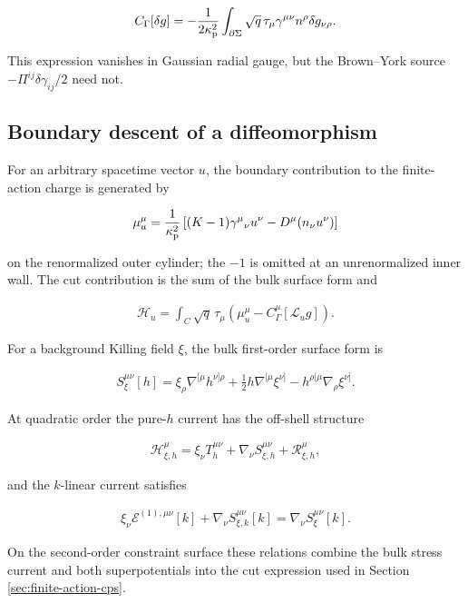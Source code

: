 \begin{align}
C_\Gamma[\delta g]
=-\frac1{2\kappa_{\rm p}^{2}}
\int_{\partial\Sigma}\sqrt q\,
\tau_\mu\gamma^{\mu\nu}n^\rho\delta g_{\nu\rho}.
\end{align}

This expression vanishes in Gaussian radial gauge, but the Brown--York source $-\Pi^{ij}\delta\gamma_{ij}/2$ need not.

\subsection{Boundary descent of a diffeomorphism}

For an arbitrary spacetime vector $u$, the boundary contribution to the finite-action charge is generated by

\begin{align}
\mu_u^\mu
=\frac1{\kappa_{\rm p}^{2}}
\left[(K-1)\gamma^\mu{}_\nu u^\nu
-D^\mu(n_\nu u^\nu)\right]
\end{align}

on the renormalized outer cylinder; the $-1$ is omitted at an unrenormalized inner wall. The cut contribution is the sum of the bulk surface form and

\begin{align}
\mathscr H_u
=\int_C\sqrt q\,\tau_\mu
\left(\mu_u^\mu-C_\Gamma^\mu[\mathcal L_ug]\right).
\end{align}

For a background Killing field $\xi$, the bulk first-order surface form is

\begin{align}
S_\xi^{\mu\nu}[h]
=\xi_\rho\nabla^{[\mu}h^{\nu]\rho}
+\frac12h\nabla^{[\mu}\xi^{\nu]}
-h^{\rho[\mu}\nabla_\rho\xi^{\nu]}.
\end{align}

At quadratic order the pure-$h$ current has the off-shell structure

\begin{align}
\mathcal H_{\xi,h}^{\mu}
=\xi_\nu T_h^{\mu\nu}
+\nabla_\nu S_{\xi,h}^{\mu\nu}
+\mathcal R_{\xi,h}^{\mu},
\end{align}

and the $k$-linear current satisfies

\begin{align}
\xi_\nu\mathcal E^{(1),\mu\nu}[k]
+\nabla_\nu S_{\xi,k}^{\mu\nu}[k]
=\nabla_\nu S_\xi^{\mu\nu}[k].
\end{align}

On the second-order constraint surface these relations combine the bulk stress current and both superpotentials into the cut expression used in Section \ref{sec:finite-action-cps}.

